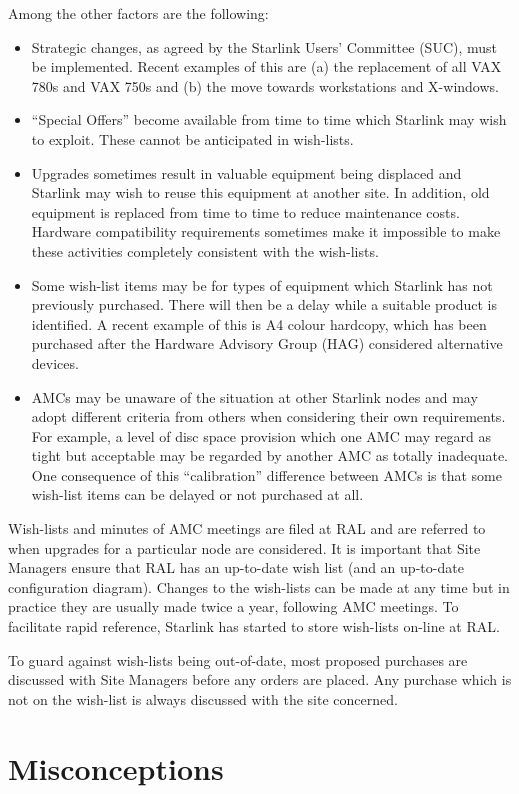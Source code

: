 Among the other factors are the following:
\begin{itemize}
\item
Strategic changes, as agreed by the Starlink Users' Committee (SUC), must be
implemented.  Recent examples of this are (a) the replacement of all
VAX 780s and VAX 750s and (b) the move towards workstations and X-windows.
\item
``Special Offers'' become available from time to time which Starlink
may wish to exploit.  These cannot be anticipated in wish-lists.
\item
Upgrades sometimes result in valuable equipment being displaced and
Starlink may wish to reuse this equipment at another site.
In addition, old equipment is replaced from time to time
to reduce maintenance costs.  Hardware compatibility requirements
sometimes make it impossible to make these activities completely
consistent with the wish-lists.
\item
Some wish-list items may be for types of equipment which Starlink has
not previously purchased.  There will then be a delay while a
suitable product is identified.  A recent example of this is
A4 colour hardcopy, which has been purchased after the Hardware
Advisory Group (HAG) considered alternative devices.
\item
AMCs may be unaware of the situation at other Starlink nodes and may
adopt different criteria from others when considering their own requirements.
For example, a level of disc space provision which one AMC may regard as
tight but acceptable may be regarded by another AMC as totally
inadequate.  One consequence of this ``calibration'' difference between AMCs
is that some wish-list items can be delayed or not purchased at all.
\end{itemize}
Wish-lists and minutes of AMC meetings are filed at RAL and are
referred to when upgrades for a particular node are considered.
It is important that Site Managers ensure that RAL has an up-to-date
wish list (and an up-to-date configuration diagram).  Changes
to the wish-lists can be made at any time but in practice they are usually
made twice a year, following AMC meetings.  To facilitate rapid reference,
Starlink has started to store wish-lists on-line at RAL.

To guard against wish-lists being out-of-date,
most proposed purchases are discussed with
Site Managers before any orders are placed.  Any purchase
which is not on the wish-list is always discussed with the site concerned.

\section {Misconceptions}

